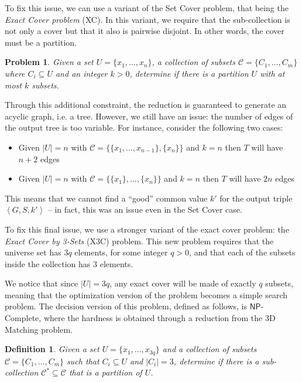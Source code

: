 \documentclass[12pt,a4paper]{article}
\newtheorem{definition}{Definition}
\newtheorem{problem}{Problem}
\newcommand{\curlyquotes}[1]{\textquotedblleft #1\textquotedblright}
\newcommand{\abs}[1]{\left|#1\right|}
\newcommand{\abk}[1]{\left\langle#1\right\rangle}
\begin{document}
    To fix this issue, we can use a variant of the Set Cover problem, that being the \textit{Exact Cover problem } (XC). In this variant, we require that the sub-collection is not only a cover but that it also is pairwise disjoint. In other words, the cover must be a partition. 

    \begin{problem}
        Given a set $U = \{x_1, \ldots, x_n\}$, a collection of subsets $\mathcal{C} = \{C_1, \ldots, C_m\}$ where $C_i \subseteq U$ and an integer $k > 0$, determine if there is a partition $U$ with at most $k$ subsets.
    \end{problem}

    Through this additional constraint, the reduction is guaranteed to generate an acyclic graph, i.e. a tree. However, we still have an issue: the number of edges of the output tree is too variable. For instance, consider the following two cases:
    \begin{itemize}
        \item Given $\abs{U}= n$ with $\mathcal{C} = \{\{x_1, \ldots, x_{n-1}\}, \{x_n\}\}$ and $k = n$ then $T$ will have $n+2$ edges
        \item Given $\abs{U}= n$ with $\mathcal{C} = \{\{x_1\}, \ldots, \{x_n\}\}$ and $k = n$ then $T$ will have $2n$ edges
    \end{itemize}
    
    This means that we cannot find a \curlyquotes{good} common value $k'$ for the output triple $\abk{G,S,k'}$ -- in fact, this was an issue even in the Set Cover case.
    
    To fix this final issue, we use a stronger variant of the exact cover problem: the \textit{Exact Cover by 3-Sets} (X3C) problem. This new problem requires that the universe set has $3q$ elements, for some integer $q > 0$, and that each of the subsets inside the collection has $3$ elements.
    
    We notice that since $\abs{U} = 3q$, any exact cover will be made of exactly $q$ subsets, meaning that the optimization version of the problem becomes a simple search problem. The decision version of this problem, defined as follows, is $\mathsf{NP}$-Complete, where the hardness is obtained through a reduction from the 3D Matching problem.

    \begin{definition}
        Given a set $U = \{x_1, \ldots, x_{3q}\}$ and a collection of subsets $\mathcal{C} = \{C_1, \ldots, C_m\}$ such that $C_i \subseteq U$ and $\abs{C_i} = 3$, determine if there is a sub-collection $\mathcal{C}^* \subseteq  \mathcal{C}$ that is a partition of $U$.
    \end{definition}
\end{document}
